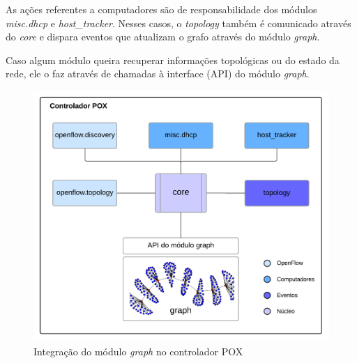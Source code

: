 As ações referentes a computadores são de responsabilidade dos módulos
\emph{misc.dhcp} e \emph{host\_tracker}.
Nesses casos, o \emph{topology} também é comunicado através do \emph{core} e
dispara eventos que atualizam o grafo através do módulo \emph{graph}.

Caso algum módulo queira recuperar informações topológicas ou do estado da
rede, ele o faz através de chamadas à interface (API) do módulo \emph{graph}.

\begin{figure}[h!]
    \centering
    \label{fig:graph-integration}
    \includegraphics{img/graph-module-integration}
    \caption{Integração do módulo \emph{graph} no controlador POX}
\end{figure}

